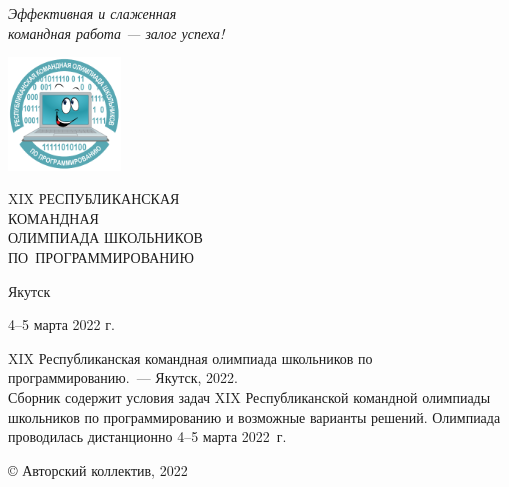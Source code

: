 \documentclass[a5paper, twoside, 11pt]{article}
\begin{document}
\pagestyle{empty}

\begin{flushright}
\it
Эффективная и слаженная\\
командная работа --- залог успеха!
\end{flushright}
{}\vskip-15mm

\includegraphics[width=3cm, height=3cm]{logo.pdf}
\\[3cm]

\begin{center}
\huge
XIX РЕСПУБЛИКАНСКАЯ \\КОМАНДНАЯ\\ОЛИМПИАДА ШКОЛЬНИКОВ \\
ПО~ПРОГРАММИРОВАНИЮ
\end{center}

\vfill
\centerline{Якутск}
\centerline{4--5 марта 2022 г.}
\newpage
\noindent XIX Республиканская командная олимпиада школьников по программированию.~--- Якутск, 2022.
\\[5mm]
Сборник содержит условия задач XIX Республиканской командной олимпиады школьников по программированию и возможные варианты решений. Олимпиада проводилась дистанционно 
4--5 марта 2022~г.
\vfill

{}\hfill © Авторский коллектив, 2022
\end{document}
